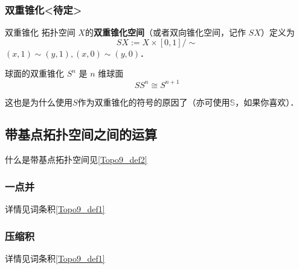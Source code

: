 
\subsubsection{双重锥化<待定>}

\begin{definition}{双重锥化}
拓扑空间 $X$的\textbf{双重锥化空间}（或者双向锥化空间，记作 $S X$）定义为
\[
    S X := X \times [0,1] / \sim
\]
$(x, 1) \sim (y, 1), (x, 0) \sim (y, 0)$．
\end{definition}

\begin{theorem}{球面的双重锥化}
$S^n$ 是 $n$ 维球面
\[
S S^n \cong S^{n+1}
\]
\end{theorem}
这也是为什么使用$S$作为双重锥化的符号的原因了（亦可使用$\mathbb{S}$，如果你喜欢）．


\subsection{带基点拓扑空间之间的运算}

什么是带基点拓扑空间见\autoref{Topo9_def2}~

\subsubsection{一点并}

详情见词条积\autoref{Topo9_def1}~


\subsubsection{压缩积}

详情见词条积\autoref{Topo9_def1}~




